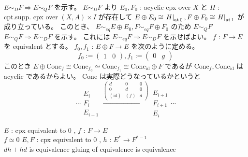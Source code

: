 \documentclass[dvipdfmx]{jsarticle}
\begin{document}
\begin{Proof}[二つの定義の同値性]
\itemprof
  \(E \sim_{D} F \Rightarrow E \sim_{Q} F\) を示す。 
  \(E \sim_{D} F\) より \(E_0 , F_0\) : acyclic cpx over \(X\) と \(H\) : cpt.supp. cpx over \((X,A) \times I\) が存在して \(E \oplus E_0 \cong \left. {H} \right| _{\text{at} \, 0} , F \oplus F_0 \cong \left. {H} \right| _{\text{at} \, 1}\) が成り立っている。
  このとき、 \(E \sim_{eq} E \oplus E_0 , F \sim_{eq} F \oplus F_0\) のため \(E \sim_{Q} F\)
\itemprof
  \(E \sim_{Q} F \Rightarrow E \sim_{D} F\) を示す。
  これには \(E \sim_{eq} F \Rightarrow E \sim_{D} F\) を示せばよい。
  \(f\) : \(F \to E\) を equivalent とする。
  \(f_0 , f_1\) : \(E \oplus F \to E\) を次のように定める。
  \[
    f_0 := \begin{pmatrix}
      1 & 0
    \end{pmatrix} ,
    f_1 := \begin{pmatrix}
      0 & g
    \end{pmatrix}
  \] 
  このとき \(E \oplus \text{Cone}_f \cong \text{Cone}_{f_0} \simeq \text{Cone}_{f_1} \cong \text{Cone}_{\text{id}} \oplus F\) であるが \(\text{Cone}_f , \text{Cone}_{\text{id}}\) は acyclic であるからよい。 Cone は実際どうなっているかというと
  \[
    \cdots \begin{matrix}
      E_{i} \\
      F_{i} \\
      E_{i-1}
    \end{matrix}
    \overset{
      \begin{pmatrix}
        d & 0 & 0 \\
        0 & d & 0 \\
        (\text{id}) & (f) & d
      \end{pmatrix}
    }{\to}
    \begin{matrix}
      E_{i+1} \\
      F_{i+1} \\
      E_{i}
    \end{matrix}
    \cdots
  \]
\end{Proof}

\begin{Theorem}
\itemprop
  \For \(E\) : cpx equivalent to \(0\) , \(f\) : \(F \to E\) \\
  \Then \(f \simeq 0\)
\itemprop
  \For \(E,F\) : cpx equivalent to \(0\) , \(h\) : \(E^{*} \to F^{*-1}\) \\
  \Then \(d h + h d\) is equivalence
\itemprop
  gluing of equivalence is equivalence
\end{Theorem}
\end{document}
